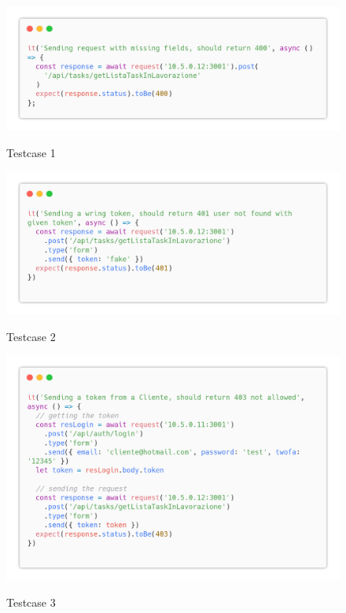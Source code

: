 \documentclass{report}
\begin{document}
\begin{figure}[H]
	\centering\includegraphics[width=1\textwidth]{images/code_in_lavorazione_test1.png}
	
	Testcase 1
\end{figure}
\begin{figure}[H]
	\centering\includegraphics[width=1\textwidth]{images/code_in_lavorazione_test2.png}
	
	Testcase 2
\end{figure}
\begin{figure}[H]
	\centering\includegraphics[width=1\textwidth]{images/code_in_lavorazione_test3.png}
	
	Testcase 3
\end{figure}
\end{document}
